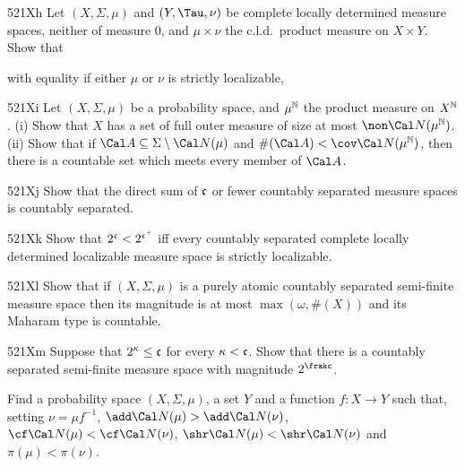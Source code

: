 {\spheader 521Xh Let $(X,\Sigma,\mu)$ and $(Y,\Tau,\nu)$ be complete
locally determined measure spaces, neither of measure $0$,
and $\mu\times\nu$ the c.l.d.\ product measure on $X\times Y$.   Show that



\noindent with equality if either $\mu$ or $\nu$ is strictly localizable,






\spheader 521Xi Let $(X,\Sigma,\mu)$ be a probability space, and
$\mu^{\Bbb N}$ the product measure on $X^{\Bbb N}$.
(i) Show that $X$ has a set of full
outer measure of size at most $\non\Cal N(\mu^{\Bbb N})$.
(ii) Show that if $\Cal A\subseteq\Sigma\setminus\Cal N(\mu)$ and
$\#(\Cal A)<\cov\Cal N(\mu^{\Bbb N})$, then there is a countable set
which meets every member of $\Cal A$.

\spheader 521Xj Show that the direct sum of $\frak c$ or fewer
countably separated measure spaces is countably separated.

\spheader 521Xk Show that $2^{\frak c}<2^{\frak c^+}$ iff every
countably separated complete locally determined localizable measure
space is strictly localizable.  

\spheader 521Xl Show that if $(X,\Sigma,\mu)$ is a purely atomic
countably separated semi-finite measure space then its magnitude is at
most $\max(\omega,\#(X))$ and its Maharam type is countable.

\spheader 521Xm Suppose that $2^{\kappa}\le\frak c$ for every
$\kappa<\frak c$.   Show that there is a countably separated
semi-finite measure space with magnitude $2^{\frakc}$.

Find a probability space $(X,\Sigma,\mu)$, a set $Y$ and
a function $f:X\to Y$ such that, setting $\nu=\mu f^{-1}$,
$\add\Cal N(\mu)>\add\Cal N(\nu)$, $\cf\Cal N(\mu)<\cf\Cal N(\nu)$,
$\shr\Cal N(\mu)<\shr\Cal N(\nu)$ and $\pi(\mu)<\pi(\nu)$.

}
